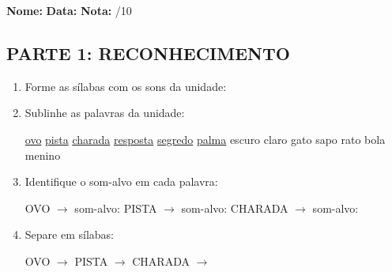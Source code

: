 \begin{exercicio}

\noindent\textbf{Nome:} \underline{\hspace{3.2cm}} \quad \textbf{Data:} \underline{\hspace{1.6cm}} \quad \textbf{Nota:} \underline{\hspace{0.9cm}}/10


\subsection*{PARTE 1: RECONHECIMENTO}

\begin{enumerate}

  \item Forme as sílabas com os sons da unidade:

\begin{center}
\end{center}

  \item Sublinhe as palavras da unidade:

\begin{center}
  \uline{ovo} \quad \uline{pista} \quad \uline{charada} \quad \uline{resposta} \quad \uline{segredo} \quad \uline{palma} \quad escuro \quad claro \quad gato \quad sapo \quad rato \quad bola \quad menino
\end{center}

  \item Identifique o som-alvo em cada palavra:
  \begin{center}
  OVO $\rightarrow$ som-alvo: \underline{\hspace{1cm}} \quad PISTA $\rightarrow$ som-alvo: \underline{\hspace{1cm}} \quad CHARADA $\rightarrow$ som-alvo: \underline{\hspace{1cm}}
  \end{center}

  \item Separe em sílabas:
  \begin{center}
  OVO $\rightarrow$ \underline{\hspace{1cm}} \quad PISTA $\rightarrow$ \underline{\hspace{1cm}} \quad CHARADA $\rightarrow$ \underline{\hspace{1cm}}
  \end{center}


\end{enumerate}
\end{exercicio}
